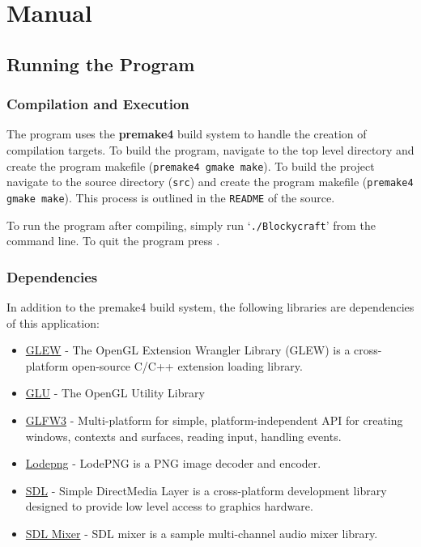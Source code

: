 \documentclass{book}
\begin{document}
\chapter{Manual}
\section{Running the Program}
\subsection{Compilation and Execution}
The program uses the \textbf{premake4} build system to handle the creation of compilation targets.  To build the program, navigate to the top level directory and create the program makefile (\texttt{premake4 gmake  make}).  To build the project navigate to the source directory (\texttt{src}) and create the program makefile (\texttt{premake4 gmake make}).
This process is outlined in the \texttt{README} of the source.

To run the program after compiling, simply run `\texttt{./Blockycraft}' from the command line.  To quit the program press .

\subsection{Dependencies}
In addition to the premake4 build system, the following libraries are dependencies of this application: 
\begin{itemize}
	\item \href{https://github.com/nigels-com/glew}{GLEW} - The OpenGL Extension Wrangler Library (GLEW) is a cross-platform open-source C/C++ extension loading library.
	\item \href{https://www.opengl.org/resources/libraries/}{GLU} - The OpenGL Utility Library
	\item \href{http://www.glfw.org/docs/latest/}{GLFW3} - Multi-platform for simple, platform-independent API for creating windows, contexts and surfaces, reading input, handling events.
	\item \href{http://lodev.org/lodepng/}{Lodepng} - LodePNG is a PNG image decoder and encoder.
	\item \href{https://www.libsdl.org/}{SDL} - Simple DirectMedia Layer is a cross-platform development library designed to provide low level access to graphics hardware.
	\item \href{https://www.libsdl.org/projects/SDL_mixer/}{SDL Mixer} - SDL mixer is a sample multi-channel audio mixer library. 
\end{itemize}
\end{document}
